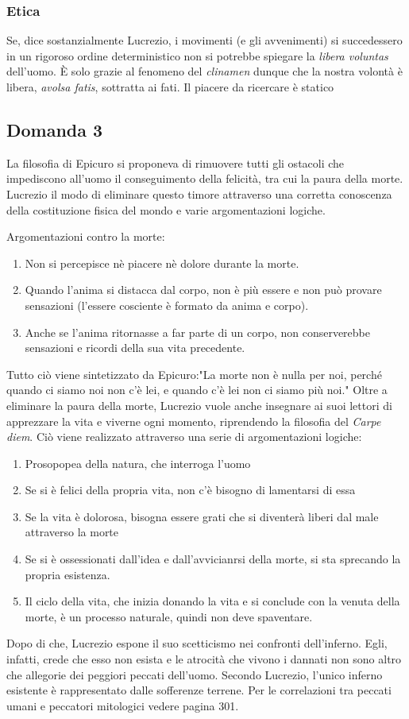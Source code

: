 \documentclass[10pt,a4paper]{article}
\begin{document}
	 \subsubsection{Etica}
	 
	 Se, dice sostanzialmente Lucrezio, i movimenti (e gli avvenimenti) si succedessero in un rigoroso ordine deterministico non si potrebbe spiegare la \textit{libera voluntas} dell'uomo.
	 È solo grazie al fenomeno del \textit{clinamen} dunque che la nostra volontà è libera, \textit{avolsa fatis}, sottratta ai fati. Il piacere da ricercare è statico
	
	\subsection{Domanda 3}
	
	La filosofia di Epicuro si proponeva di rimuovere tutti gli ostacoli che impediscono all'uomo il conseguimento della felicità, tra cui la paura della morte. Lucrezio il modo di eliminare questo timore attraverso una corretta conoscenza della costituzione fisica del mondo e varie argomentazioni logiche.
	
	Argomentazioni contro la morte:
	\begin{enumerate}
		\item Non si percepisce nè piacere nè dolore durante la morte.
		\item Quando l'anima si distacca dal corpo, non è più essere e non può provare sensazioni (l'essere cosciente è formato da anima e corpo).
		\item Anche se l'anima ritornasse a far parte di un corpo, non conserverebbe sensazioni e ricordi della sua vita precedente.
	\end{enumerate} 
	Tutto ciò viene sintetizzato da Epicuro:"La morte non è nulla per noi, perché quando ci siamo noi non c'è lei, e quando c'è lei non ci siamo più noi."
	Oltre a eliminare la paura della morte, Lucrezio vuole anche insegnare ai suoi lettori di apprezzare la vita e viverne ogni momento, riprendendo la filosofia del \textit{Carpe diem}. Ciò viene realizzato attraverso una serie di argomentazioni logiche:
	\begin{enumerate}
		\item Prosopopea della natura, che interroga l'uomo
		\item Se si è felici della propria vita, non c'è bisogno di lamentarsi di essa
		\item Se la vita è dolorosa, bisogna essere grati che si diventerà liberi dal male attraverso la morte
		\item Se si è ossessionati dall'idea e dall'avvicianrsi della morte, si sta sprecando la propria esistenza.
		\item Il ciclo della vita, che inizia donando la vita e si conclude con la venuta della morte, è un processo naturale, quindi non deve spaventare.
	\end{enumerate}
	Dopo di che, Lucrezio espone il suo scetticismo nei confronti dell'inferno. Egli, infatti, crede che esso non esista e le atrocità che vivono i dannati non sono altro che allegorie dei peggiori peccati dell'uomo. Secondo Lucrezio, l'unico inferno esistente è rappresentato dalle sofferenze terrene. Per le correlazioni tra peccati umani e peccatori mitologici vedere pagina 301.
	
\end{document}
